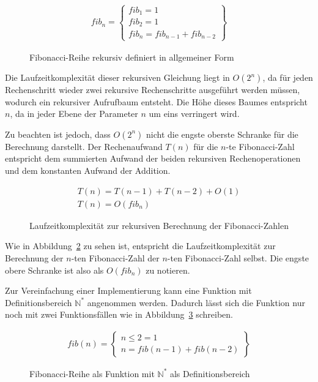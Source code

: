 \documentclass[11pt, parskip=half]{scrartcl}       %
\newcommand*{\N}{\mathbb{N}}
\begin{document}
\begin{figure}[h]
  \centering
  \begin{gather*}
    fib _{n} = \left.
      \begin{cases}
        fib_{1} = 1 \\
        fib_{2} = 1 \\
        fib_{n} = fib_{n-1} + fib_{n-2}
      \end{cases}
    \right\}    
  \end{gather*}
  \caption{Fibonacci-Reihe rekursiv definiert in allgemeiner Form}
  \label{fig:fib1}
\end{figure}

Die Laufzeitkomplexität dieser rekursiven Gleichung liegt in $O(2^{n})$, da für jeden Rechenschritt wieder zwei rekursive Rechenschritte ausgeführt werden müssen, wodurch ein rekursiver Aufrufbaum entsteht.
Die Höhe dieses Baumes entspricht $n$, da in jeder Ebene der Parameter $n$ um eins verringert wird.

Zu beachten ist jedoch, dass $O(2^{n})$ nicht die engste oberste Schranke für die Berechnung darstellt.
Der Rechenaufwand $T(n)$ für die $n$-te Fibonacci-Zahl entspricht dem summierten Aufwand der beiden rekursiven Rechenoperationen und dem konstanten Aufwand der Addition.

\begin{figure}[h]
  \centering
  \begin{gather*}
    T(n) = T(n-1) + T(n-2) + O(1) \\
    T(n) = O(fib_{n})
  \end{gather*}
  \caption{Laufzeitkomplexität zur rekursiven Berechnung der Fibonacci-Zahlen}
  \label{fig:fib-komplexität}
\end{figure}

Wie in Abbildung~\ref{fig:fib-komplexität} zu sehen ist, entspricht die Laufzeitkomplexität zur Berechnung der $n$-ten Fibonacci-Zahl der $n$-ten Fibonacci-Zahl selbst.
Die engste obere Schranke ist also als $O(fib_{n})$ zu notieren.

Zur Vereinfachung einer Implementierung kann eine Funktion mit Definitionsbereich $\N^*$ angenommen werden.
Dadurch lässt sich die Funktion nur noch mit zwei Funktionsfällen wie in Abbildung~\ref{fig:fib2} schreiben.

\begin{figure}[h]
  \centering
  \begin{gather*}
    fib (n) = \left.
      \begin{cases}
        n \leq 2 = 1 \\
        n = fib(n-1) + fib(n-2)
      \end{cases}
    \right\}    
  \end{gather*}
  \caption{Fibonacci-Reihe als Funktion mit $\N^*$ als Definitionsbereich}
  \label{fig:fib2}
\end{figure}
\end{document}
